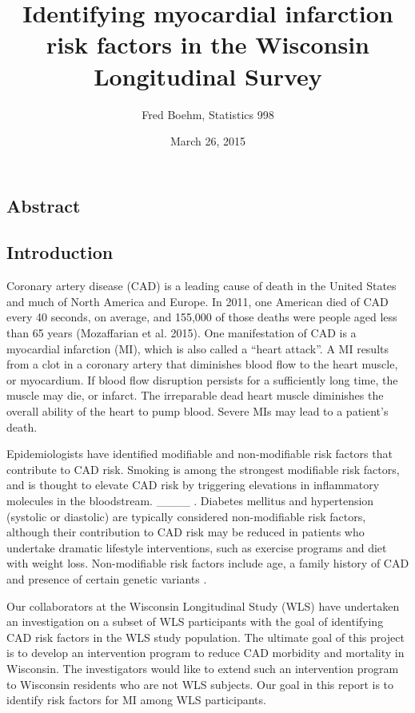 \documentclass[11pt,]{article}
\title{Identifying myocardial infarction risk factors in the Wisconsin
Longitudinal Survey}
\author{Fred Boehm, Statistics 998}
\date{March 26, 2015}
\begin{document}
\maketitle


\listoftodos

\subsection{Abstract}\label{abstract}

\subsection{Introduction}\label{introduction}

Coronary artery disease (CAD) is a leading cause of death in the United
States and much of North America and Europe. In 2011, one American died
of CAD every 40 seconds, on average, and 155,000 of those deaths were
people aged less than 65 years (Mozaffarian et al. 2015). One
manifestation of CAD is a myocardial infarction (MI), which is also
called a ``heart attack''. A MI results from a clot in a coronary artery
that diminishes blood flow to the heart muscle, or myocardium. If blood
flow disruption persists for a sufficiently long time, the muscle may
die, or infarct. The irreparable dead heart muscle diminishes the
overall ability of the heart to pump blood. Severe MIs may lead to a
patient's death.

Epidemiologists have identified modifiable and non-modifiable risk
factors that contribute to CAD risk. Smoking is among the strongest
modifiable risk factors, and is thought to elevate CAD risk by
triggering elevations in inflammatory molecules in the bloodstream.
\_\_\_\_
.
Diabetes mellitus and hypertension (systolic or diastolic) are typically
considered non-modifiable risk factors, although their contribution to
CAD risk may be reduced in patients who undertake dramatic lifestyle
interventions, such as exercise programs and diet with weight loss.
Non-modifiable risk factors include age, a family history of CAD and
presence of certain genetic variants
.

Our collaborators at the Wisconsin Longitudinal Study (WLS) have
undertaken an investigation on a subset of WLS participants with the
goal of identifying CAD risk factors in the WLS study population. The
ultimate goal of this project is to develop an intervention program to
reduce CAD morbidity and mortality in Wisconsin. The investigators would
like to extend such an intervention program to Wisconsin residents who
are not WLS subjects. Our goal in this report is to identify risk
factors for MI among WLS participants.
\end{document}
